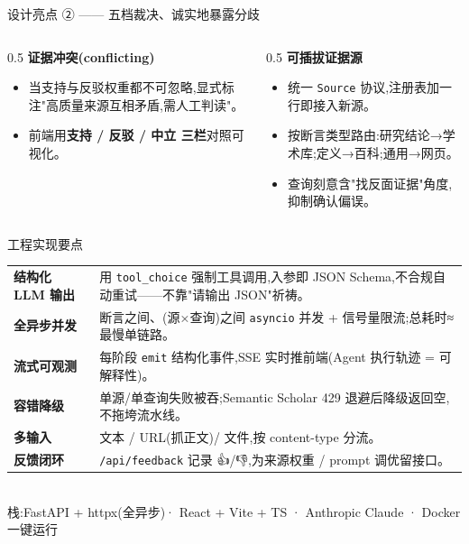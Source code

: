 \documentclass[aspectratio=169,11pt]{beamer}
\begin{document}
\begin{frame}{设计亮点 ② —— 五档裁决、诚实地暴露分歧}
  \centering
  \vspace{4mm}
  \begin{columns}[T]
    \begin{column}{0.5\textwidth}
      \textbf{证据冲突(conflicting)}
      \footnotesize
      \begin{itemize}
        \item 当支持与反驳权重都不可忽略,显式标注"高质量来源互相矛盾,需人工判读"。
        \item 前端用\textbf{支持 / 反驳 / 中立 三栏}对照可视化。
      \end{itemize}
    \end{column}
    \begin{column}{0.5\textwidth}
      \textbf{可插拔证据源}
      \footnotesize
      \begin{itemize}
        \item 统一 \texttt{Source} 协议,注册表加一行即接入新源。
        \item 按断言类型路由:研究结论→学术库;定义→百科;通用→网页。
        \item 查询刻意含"找反面证据"角度,抑制确认偏误。
      \end{itemize}
    \end{column}
  \end{columns}
\end{frame}

\begin{frame}{工程实现要点}
  \footnotesize
  \begin{tabular}{@{}p{3.1cm}p{8.4cm}@{}}
    \toprule
    \textbf{结构化 LLM 输出} & 用 \texttt{tool\_choice} 强制工具调用,入参即 JSON Schema,不合规自动重试——不靠"请输出 JSON"祈祷。\\
    \textbf{全异步并发} & 断言之间、(源×查询)之间 \texttt{asyncio} 并发 + 信号量限流;总耗时≈最慢单链路。\\
    \textbf{流式可观测} & 每阶段 \texttt{emit} 结构化事件,SSE 实时推前端(Agent 执行轨迹 = 可解释性)。\\
    \textbf{容错降级} & 单源/单查询失败被吞;Semantic Scholar 429 退避后降级返回空,不拖垮流水线。\\
    \textbf{多输入} & 文本 / URL(抓正文)/ 文件,按 content-type 分流。\\
    \textbf{反馈闭环} & \texttt{/api/feedback} 记录 👍/👎,为来源权重 / prompt 调优留接口。\\
    \bottomrule
  \end{tabular}
  \vspace{2mm}
  \\{\scriptsize 栈:FastAPI + httpx(全异步)· React + Vite + TS · Anthropic Claude · Docker 一键运行}
\end{frame}
\end{document}

